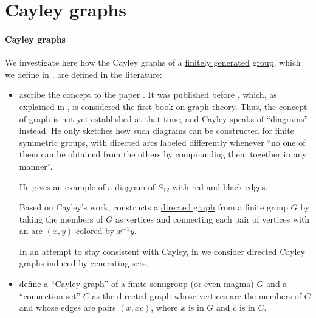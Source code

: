\section{Cayley graphs}\label{sec:cayley_graphs}

\paragraph{Cayley graphs}

\begin{remark}\label{rem:cayley_graph_overview}
  We investigate here how the Cayley graphs of a \hyperref[def:group_presentation]{finitely generated} \hyperref[def:group]{group}, which we define in , are defined in the literature:
  \begin{itemize}
    \item {} ascribe the concept to the paper . It was published before \cite{König1986Graphentheorie}, which, as explained in , is considered the first book on graph theory. Thus, the concept of graph is not yet established at that time, and Cayley speaks of \enquote{diagrams} instead. He only sketches how such diagrams can be constructed for finite \hyperref[def:symmetric_group]{symmetric groups}, with directed arcs \hyperref[def:labeled_set]{labeled} differently whenever \enquote{no one of them can be obtained from the others by compounding them together in any manner}.

    He gives an example of a diagram of \( S_{12} \) with red and black edges.

    Based on Cayley's work,  constructs a \hyperref[def:directed_graph]{directed graph} from a finite group \( G \) by taking the members of \( G \) as vertices and connecting each pair of vertices with an arc \( (x, y) \) colored by \( x^{-1} y \).

    In an attempt to stay consistent with Cayley, in  we consider directed Cayley graphs induced by generating sets.

    \item {} define a \enquote{Cayley graph} of a finite \hyperref[def:semigroup]{semigroup} (or even \hyperref[rem:magma_terminology]{magma}) \( G \) and a \enquote{connection set} \( C \) as the directed graph whose vertices are the members of \( G \) and whose edges are pairs \( (x, xc) \), where \( x \) is in \( G \) and \( c \) is in \( C \).


\end{itemize}
\end{remark}
